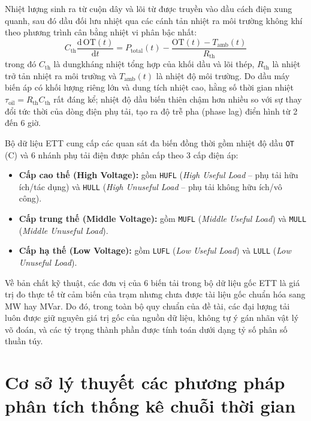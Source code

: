 \documentclass[12pt,a4paper,oneside]{report}
\newcommand{\dC}{\textdegree C\xspace}
\newcommand{\code}[1]{\texttt{#1}}
\begin{document}
Nhiệt lượng sinh ra từ cuộn dây và lõi từ được truyền vào dầu cách điện xung quanh, sau đó dầu đối lưu nhiệt qua các cánh tản nhiệt ra môi trường không khí theo phương trình cân bằng nhiệt vi phân bậc nhất:
\begin{equation}
  C_{\text{th}} \frac{\mathrm{d}\,\text{OT}(t)}{\mathrm{d}t} = P_{\text{total}}(t) - \frac{\text{OT}(t) - T_{\text{amb}}(t)}{R_{\text{th}}}
\end{equation}
trong đó $C_{\text{th}}$ là dungkháng nhiệt tổng hợp của khối dầu và lõi thép, $R_{\text{th}}$ là nhiệt trở tản nhiệt ra môi trường và $T_{\text{amb}}(t)$ là nhiệt độ môi trường. Do dầu máy biến áp có khối lượng riêng lớn và dung tích nhiệt cao, hằng số thời gian nhiệt $\tau_{\text{oil}} = R_{\text{th}} C_{\text{th}}$ rất đáng kể; nhiệt độ dầu biến thiên chậm hơn nhiều so với sự thay đổi tức thời của dòng điện phụ tải, tạo ra độ trễ pha (phase lag) điển hình từ 2 đến 6 giờ.

Bộ dữ liệu ETT \cite{zhou2021informer} cung cấp các quan sát đa biến đồng thời gồm nhiệt độ dầu \code{OT} (\dC) và 6 nhánh phụ tải điện được phân cấp theo 3 cấp điện áp:
\begin{itemize}
  \item \textbf{Cấp cao thế (High Voltage):} gồm \code{HUFL} (\textit{High Useful Load} -- phụ tải hữu ích/tác dụng) và \code{HULL} (\textit{High Unuseful Load} -- phụ tải không hữu ích/vô công).
  \item \textbf{Cấp trung thế (Middle Voltage):} gồm \code{MUFL} (\textit{Middle Useful Load}) và \code{MULL} (\textit{Middle Unuseful Load}).
  \item \textbf{Cấp hạ thế (Low Voltage):} gồm \code{LUFL} (\textit{Low Useful Load}) và \code{LULL} (\textit{Low Unuseful Load}).
\end{itemize}

Về bản chất kỹ thuật, các đơn vị của 6 biến tải trong bộ dữ liệu gốc ETT là giá trị đo thực tế từ cảm biến của trạm nhưng chưa được tài liệu gốc chuẩn hóa sang MW hay MVar. Do đó, trong toàn bộ quy chuẩn của đề tài, các đại lượng tải luôn được giữ nguyên giá trị gốc của nguồn dữ liệu, không tự ý gán nhãn vật lý võ đoán, và các tỷ trọng thành phần được tính toán dưới dạng tỷ số phân số thuần túy.

\section{Cơ sở lý thuyết các phương pháp phân tích thống kê chuỗi thời gian}
\end{document}
